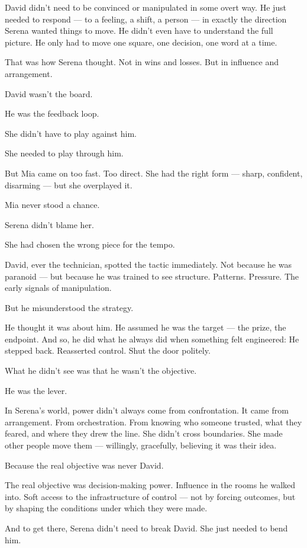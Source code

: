 David didn’t need to be convinced or manipulated in some overt way.
He just needed to respond — to a feeling, a shift, a person — in exactly the direction Serena wanted things to move.
He didn’t even have to understand the full picture.
He only had to move one square, one decision, one word at a time.

That was how Serena thought.
Not in wins and losses.
But in influence and arrangement.

David wasn’t the board.

He was the feedback loop.

She didn’t have to play against him.

She needed to play through him.

But Mia came on too fast. Too direct.
She had the right form — sharp, confident, disarming — but she overplayed it.

Mia never stood a chance.

Serena didn’t blame her.

She had chosen the wrong piece for the tempo.

David, ever the technician, spotted the tactic immediately.
Not because he was paranoid — but because he was trained to see structure.
Patterns. Pressure. The early signals of manipulation.

But he misunderstood the strategy.

He thought it was about him.
He assumed he was the target — the prize, the endpoint.
And so, he did what he always did when something felt engineered:
He stepped back. Reasserted control. Shut the door politely.

What he didn’t see was that he wasn’t the objective.

He was the lever.

In Serena’s world, power didn’t always come from confrontation.
It came from arrangement. From orchestration.
From knowing who someone trusted, what they feared, and where they drew the line.
She didn’t cross boundaries.
She made other people move them — willingly, gracefully, believing it was their idea.

Because the real objective was never David.

The real objective was decision-making power.
Influence in the rooms he walked into.
Soft access to the infrastructure of control — not by forcing outcomes,
but by shaping the conditions under which they were made.

And to get there, Serena didn’t need to break David.
She just needed to bend him.

